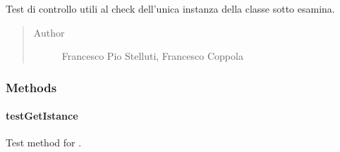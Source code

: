 \documentclass[letterpaper,10pt,italian,openany,oneside]{sphinxmanual}
\begin{document}
\begin{fulllineitems}
\label{\detokenize{test/it/unicam/cs/pa/mastermind/test/UIConsoleStartViewTest:it.unicam.cs.pa.mastermind.test.UIConsoleStartViewTest}}
Test di controllo utili al check dell’unica instanza della classe sotto esamina.
\begin{quote}\begin{description}
\item[{Author}] \leavevmode
Francesco Pio Stelluti, Francesco Coppola

\end{description}\end{quote}

\end{fulllineitems}



\subsubsection{Methods}
\label{\detokenize{test/it/unicam/cs/pa/mastermind/test/UIConsoleStartViewTest:methods}}

\paragraph{testGetIstance}
\label{\detokenize{test/it/unicam/cs/pa/mastermind/test/UIConsoleStartViewTest:testgetistance}}

\begin{fulllineitems}
\label{\detokenize{test/it/unicam/cs/pa/mastermind/test/UIConsoleStartViewTest:it.unicam.cs.pa.mastermind.test.UIConsoleStartViewTest.testGetIstance()}}
Test method for {\hyperref[\detokenize{source/it/unicam/cs/pa/mastermind/ui/ConsoleStartView:it.unicam.cs.pa.mastermind.ui.ConsoleStartView.getInstance()}]{}}.

\end{fulllineitems}




\renewcommand{\indexname}{Indice}
\printindex
\end{document}
